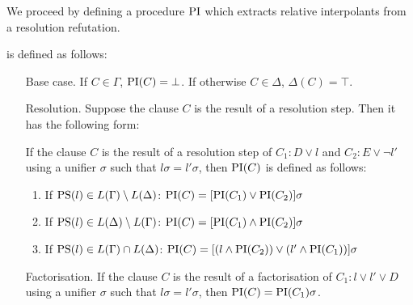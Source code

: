 We proceed by defining a procedure $\mathrm{PI}$ which extracts relative interpolants from a resolution refutation.

\begin{defi}
	 is defined as follows:
\begin{itemize}
	\item[Base case.]
		If $C \in \Gamma$, $\mathrm{PI}(C) = \bot$. 
		If otherwise $C \in \Delta$, $\Delta(C) = \top$. 
	\item[Resolution.]
	\label{def:PI_resolution}
		Suppose the clause $C$ is the result of a resolution step. Then it has the following form: 

		If the clause $C$ is the result of a resolution step of $C_1: D \lor l$ and $C_2: E \lor \lnot l'$ using a unifier $\sigma$ such that $l\sigma = l'\sigma$, then $\mathrm{PI}(C)$ is defined as follows:
		\begin{enumerate}
			\item If $\mathrm{PS}(l) \in L(\Gamma) \setminus L(\Delta)$: $\mathrm{PI}(C) = [\mathrm{PI}(C_1) \lor \mathrm{PI}(C_2)]\sigma$
			\item If $\mathrm{PS}(l) \in L(\Delta) \setminus L(\Gamma)$: $\mathrm{PI}(C) = [\mathrm{PI}(C_1) \land \mathrm{PI}(C_2)]\sigma$
			\item If $\mathrm{PS}(l) \in L(\Gamma) \cap L(\Delta)$: $\mathrm{PI}(C) = [(l \land \mathrm{PI}(C_2)) \lor (l' \land \mathrm{PI}(C_1)) ]\sigma $
		\end{enumerate}

	\item[Factorisation.]
		If the clause $C$ is the result of a factorisation of $C_1: l \lor l' \lor D$ using a unifier $\sigma$ such that $l\sigma = l'\sigma$, then $\mathrm{PI}(C) = \mathrm{PI}(C_1)\sigma$.


\end{itemize}
\end{defi}
